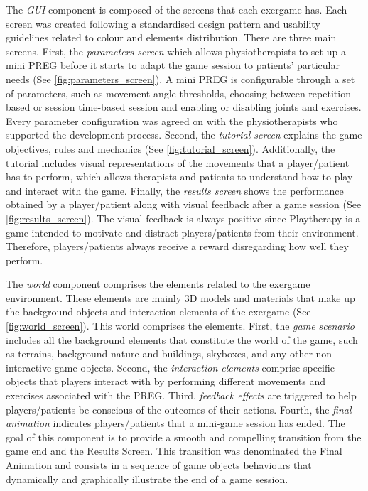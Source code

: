 The \emph{GUI} component is composed of the screens that each exergame has. Each screen was created following a standardised design pattern and usability guidelines related to colour and elements distribution. There are three main screens. First, the  \emph{parameters screen} which allows physiotherapists to set up a mini \ac{PREG} before it starts to adapt the game session to patients' particular needs (See \autoref{fig:parameters_screen}). A mini \ac{PREG} is configurable through a set of parameters, such as movement angle thresholds, choosing between repetition based or session time-based session and enabling or disabling joints and exercises. Every parameter configuration was agreed on with the physiotherapists who supported the development process. Second, the \emph{tutorial screen} explains the game objectives, rules and mechanics (See \autoref{fig:tutorial_screen}). Additionally, the tutorial includes visual representations of the movements that a player/patient has to perform, which allows therapists and patients to understand how to play and interact with the game. Finally, the \emph{results screen} shows the performance obtained by a player/patient along with visual feedback after a game session (See \autoref{fig:results_screen}). The visual feedback is always positive since Playtherapy is a game intended to motivate and distract players/patients from their environment. Therefore, players/patients always receive a reward disregarding how well they perform.
    
The \emph{world} component comprises the elements related to the exergame environment. These elements are mainly 3D models and materials that make up the background objects and interaction elements of the exergame (See \autoref{fig:world_screen}). This world comprises the elements. First, the \emph{game scenario} includes all the background elements that constitute the world of the game, such as terrains, background nature and buildings, skyboxes, and any other non-interactive game objects. Second, the \emph{interaction elements} comprise specific objects that players interact with by performing different movements and exercises associated with the \ac{PREG}. Third, \emph{feedback effects} are triggered to help players/patients be conscious of the outcomes of their actions. Fourth, the \emph{final animation} indicates players/patients that a mini-game session has ended. The goal of this component is to provide a smooth and compelling transition from the game end and the Results Screen. This transition was denominated the Final Animation and consists in a sequence of game objects behaviours that dynamically and graphically illustrate the end of a game session.

